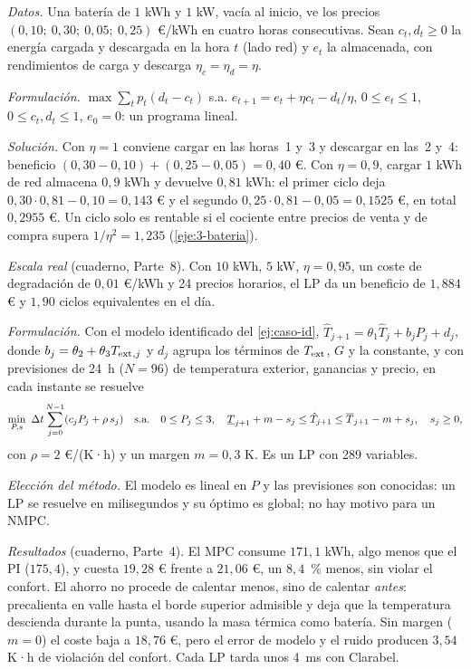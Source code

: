 \begin{ejemplo}\label{ej:bateria-lp}
\emph{Datos.} Una batería de $1$ kWh y $1$ kW, vacía al inicio, ve los precios $(0{,}10;\ 0{,}30;\ 0{,}05;\ 0{,}25)$ €/kWh en cuatro horas consecutivas. Sean $c_t,d_t\ge0$ la energía cargada y descargada en la hora $t$ (lado red) y $e_t$ la almacenada, con rendimientos de carga y descarga $\eta_c=\eta_d=\eta$.

\emph{Formulación.} $\max\sum_tp_t(d_t-c_t)$ s.a. $e_{t+1}=e_t+\eta c_t-d_t/\eta$, $0\le e_t\le1$, $0\le c_t,d_t\le1$, $e_0=0$: un programa lineal.

\emph{Solución.} Con $\eta=1$ conviene cargar en las horas~1 y~3 y descargar en las~2 y~4: beneficio $(0{,}30-0{,}10)+(0{,}25-0{,}05)=0{,}40$ €. Con $\eta=0{,}9$, cargar $1$ kWh de red almacena $0{,}9$ kWh y devuelve $0{,}81$ kWh: el primer ciclo deja $0{,}30\cdot0{,}81-0{,}10=0{,}143$ € y el segundo $0{,}25\cdot0{,}81-0{,}05=0{,}1525$ €, en total $0{,}2955$ €. Un ciclo solo es rentable si el cociente entre precios de venta y de compra supera $1/\eta^{2}=1{,}235$ (\cref{eje:3-bateria}).

\emph{Escala real} (cuaderno, Parte~8). Con $10$ kWh, $5$ kW, $\eta=0{,}95$, un coste de degradación de $0{,}01$ €/kWh y 24 precios horarios, el LP da un beneficio de $1{,}884$ € y $1{,}90$ ciclos equivalentes en el día.
\end{ejemplo}

\begin{ejemplo}\label{ej:caso-mpc}
\emph{Formulación.} Con el modelo identificado del \cref{ej:caso-id}, $\hat T_{j+1}=\theta_1\hat T_j+b_jP_j+d_j$, donde $b_j=\theta_2+\theta_3T_{\mathrm{ext}}{}_{,j}$ y $d_j$ agrupa los términos de $T_{\mathrm{ext}}$, $G$ y la constante, y con previsiones de 24~h ($N=96$) de temperatura exterior, ganancias y precio, en cada instante se resuelve
\[
\min_{P,s}\ \Dt\sum_{j=0}^{N-1}(c_jP_j+\rho\,s_j)\quad\text{s.a.}\quad 0\le P_j\le3,\quad \underline T_{j+1}+m-s_j\le\hat T_{j+1}\le\overline T_{j+1}-m+s_j,\quad s_j\ge0,
\]
con $\rho=2$ €/(K·h) y un margen $m=0{,}3$ K. Es un LP con 289 variables.

\emph{Elección del método.} El modelo es lineal en $P$ y las previsiones son conocidas: un LP se resuelve en milisegundos y su óptimo es global; no hay motivo para un NMPC.

\emph{Resultados} (cuaderno, Parte~4). El MPC consume $171{,}1$ kWh, algo menos que el PI ($175{,}4$), y cuesta $19{,}28$ € frente a $21{,}06$ €, un $8{,}4$~\% menos, sin violar el confort. El ahorro no procede de calentar menos, sino de calentar \emph{antes}: precalienta en valle hasta el borde superior admisible y deja que la temperatura descienda durante la punta, usando la masa térmica como batería. Sin margen ($m=0$) el coste baja a $18{,}76$ €, pero el error de modelo y el ruido producen $3{,}54$ K·h de violación del confort. Cada LP tarda unos 4~ms con Clarabel.
\end{ejemplo}

